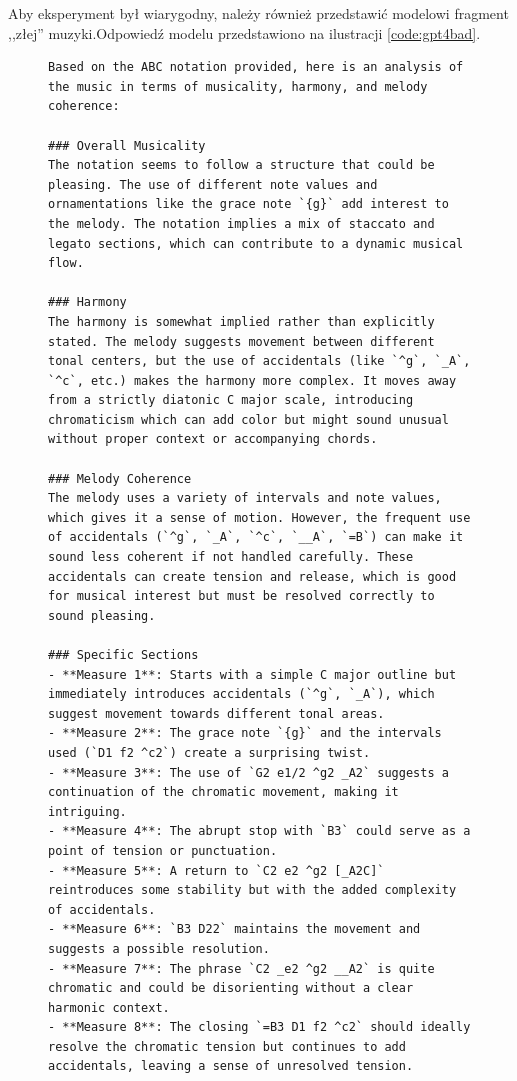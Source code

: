 \documentclass[data-science]{agh-wi} %
\begin{document}
Aby eksperyment był wiarygodny, należy również przedstawić modelowi fragment ,,złej'' muzyki.Odpowiedź modelu przedstawiono na ilustracji \ref*{code:gpt4bad}.

\begin{figure}[ht!]
    \begin{verbatim}
Based on the ABC notation provided, here is an analysis of the music in terms of musicality, harmony, and melody coherence:

### Overall Musicality
The notation seems to follow a structure that could be pleasing. The use of different note values and ornamentations like the grace note `{g}` add interest to the melody. The notation implies a mix of staccato and legato sections, which can contribute to a dynamic musical flow.

### Harmony
The harmony is somewhat implied rather than explicitly stated. The melody suggests movement between different tonal centers, but the use of accidentals (like `^g`, `_A`, `^c`, etc.) makes the harmony more complex. It moves away from a strictly diatonic C major scale, introducing chromaticism which can add color but might sound unusual without proper context or accompanying chords.

### Melody Coherence
The melody uses a variety of intervals and note values, which gives it a sense of motion. However, the frequent use of accidentals (`^g`, `_A`, `^c`, `__A`, `=B`) can make it sound less coherent if not handled carefully. These accidentals can create tension and release, which is good for musical interest but must be resolved correctly to sound pleasing. 

### Specific Sections
- **Measure 1**: Starts with a simple C major outline but immediately introduces accidentals (`^g`, `_A`), which suggest movement towards different tonal areas.
- **Measure 2**: The grace note `{g}` and the intervals used (`D1 f2 ^c2`) create a surprising twist.
- **Measure 3**: The use of `G2 e1/2 ^g2 _A2` suggests a continuation of the chromatic movement, making it intriguing.
- **Measure 4**: The abrupt stop with `B3` could serve as a point of tension or punctuation.
- **Measure 5**: A return to `C2 e2 ^g2 [_A2C]` reintroduces some stability but with the added complexity of accidentals.
- **Measure 6**: `B3 D22` maintains the movement and suggests a possible resolution.
- **Measure 7**: The phrase `C2 _e2 ^g2 __A2` is quite chromatic and could be disorienting without a clear harmonic context.
- **Measure 8**: The closing `=B3 D1 f2 ^c2` should ideally resolve the chromatic tension but continues to add accidentals, leaving a sense of unresolved tension.


\end{verbatim}
\end{figure}
\end{document}
